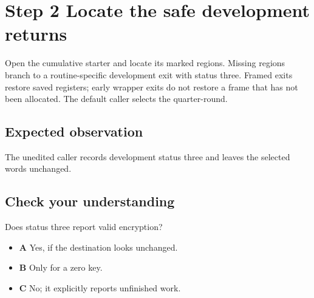\section{Step 2 Locate the safe development returns}\label{chacha-s02}

Open the cumulative starter and locate its marked regions. Missing regions branch to a routine-specific development exit with status three. Framed exits restore saved registers; early wrapper exits do not restore a frame that has not been allocated. The default caller selects the quarter-round.

\subsection{Expected observation}
The unedited caller records development status three and leaves the selected words unchanged.

\subsection{Check your understanding}
Does status three report valid encryption?

\begin{itemize}
\item \textbf{A} Yes, if the destination looks unchanged.
\item \textbf{B} Only for a zero key.
\item \textbf{C} No; it explicitly reports unfinished work.
\end{itemize}
